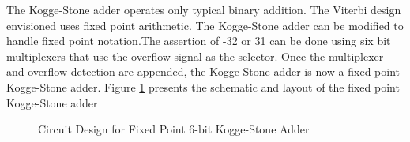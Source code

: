 \documentclass[conference]{IEEEtran}
\begin{document}
The Kogge-Stone adder operates only typical binary addition. The Viterbi design envisioned uses fixed point arithmetic. The Kogge-Stone adder can be modified to handle fixed point notation.The assertion of -32 or 31 can be done using six bit multiplexers that use the overflow signal as the selector. Once the multiplexer and overflow detection are appended, the Kogge-Stone adder is now a fixed point Kogge-Stone adder. Figure \ref{fig:ksadder6} presents the schematic and layout of the fixed point Kogge-Stone adder
\begin{figure}[h]
\centerline{
\hfil
{}}
\caption{Circuit Design for Fixed Point 6-bit Kogge-Stone Adder}
\label{fig:ksadder6}
\end{figure}
\end{document}
